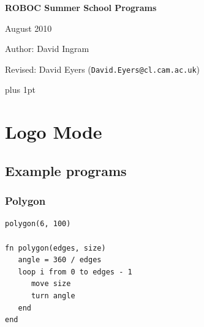 \documentclass[12pt,a4paper,twoside]{article}
\renewcommand{\_}{\texttt{\symbol{95}}}
\begin{document}
\centerline{\textbf{\LARGE ROBOC Summer School Programs}}
\vspace{0.5cm}
\centerline{August 2010}
\centerline{Author: David Ingram}
\centerline{Revised: David Eyers (\texttt{David.Eyers@cl.cam.ac.uk})}

{ \parskip 1mm plus 1pt \tableofcontents }

%
%
%
%
%

\section{Logo Mode} \label{sec:logo-mode}

\subsection{Example programs}

\subsubsection*{Polygon}

\begin{verbatim}
polygon(6, 100)

fn polygon(edges, size)
   angle = 360 / edges
   loop i from 0 to edges - 1
      move size
      turn angle
   end
end
\end{verbatim}
\end{document}
